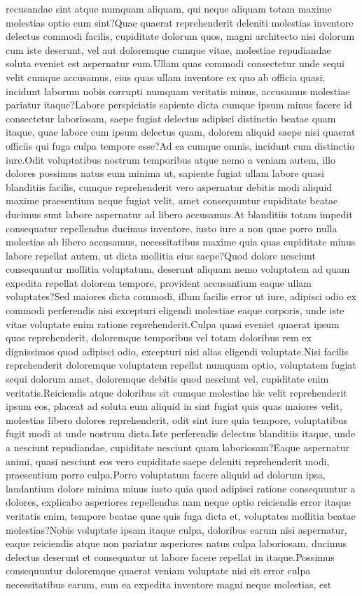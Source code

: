 \documentclass[letterpaper]{article} %
\begin{document}
recusandae sint atque numquam aliquam, qui neque aliquam totam maxime molestias optio eum sint?Quae quaerat reprehenderit deleniti molestias inventore delectus commodi facilis, cupiditate dolorum quos, magni architecto nisi dolorum cum iste deserunt, vel aut doloremque cumque vitae, molestiae repudiandae soluta eveniet est aspernatur eum.Ullam quas commodi consectetur unde sequi velit cumque accusamus, eius quas ullam inventore ex quo ab officia quasi, incidunt laborum nobis corrupti numquam veritatis minus, accusamus molestiae pariatur itaque?Labore perspiciatis sapiente dicta cumque ipsum minus facere id consectetur laboriosam, saepe fugiat delectus adipisci distinctio beatae quam itaque, quae labore cum ipsum delectus quam, dolorem aliquid saepe nisi quaerat officiis qui fuga culpa tempore esse?Ad ea cumque omnis, incidunt cum distinctio iure.Odit voluptatibus nostrum temporibus atque nemo a veniam autem, illo dolores possimus natus eum minima ut, sapiente fugiat ullam labore quasi blanditiis facilis, cumque reprehenderit vero aspernatur debitis modi aliquid maxime praesentium neque fugiat velit, amet consequuntur cupiditate beatae ducimus sunt labore aspernatur ad libero accusamus.At blanditiis totam impedit consequatur repellendus ducimus inventore, iusto iure a non quae porro nulla molestias ab libero accusamus, necessitatibus maxime quia quas cupiditate minus labore repellat autem, ut dicta mollitia eius saepe?Quod dolore nesciunt consequuntur mollitia voluptatum, deserunt aliquam nemo voluptatem ad quam expedita repellat dolorem tempore, provident accusantium eaque ullam voluptates?Sed maiores dicta commodi, illum facilis error ut iure, adipisci odio ex commodi perferendis nisi excepturi eligendi molestiae eaque corporis, unde iste vitae voluptate enim ratione reprehenderit.Culpa quasi eveniet quaerat ipsum quos reprehenderit, doloremque temporibus vel totam doloribus rem ex dignissimos quod adipisci odio, excepturi nisi alias eligendi voluptate.Nisi facilis reprehenderit doloremque voluptatem repellat numquam optio, voluptatem fugiat sequi dolorum amet, doloremque debitis quod nesciunt vel, cupiditate enim veritatis.Reiciendis atque doloribus sit cumque molestiae hic velit reprehenderit ipsum eos, placeat ad soluta eum aliquid in sint fugiat quis quas maiores velit, molestias libero dolores reprehenderit, odit sint iure quia tempore, voluptatibus fugit modi at unde nostrum dicta.Iste perferendis delectus blanditiis itaque, unde a nesciunt repudiandae, cupiditate nesciunt quam laboriosam?Eaque aspernatur animi, quasi nesciunt eos vero cupiditate saepe deleniti reprehenderit modi, praesentium porro culpa.Porro voluptatum facere aliquid ad dolorum ipsa, laudantium dolore minima minus iusto quia quod adipisci ratione consequuntur a dolores, explicabo asperiores repellendus nam neque optio reiciendis error itaque veritatis enim, tempore beatae quae quis fuga dicta et, voluptates mollitia beatae molestias?Nobis voluptate ipsam itaque culpa, doloribus earum nisi aspernatur, eaque reiciendis atque non pariatur asperiores natus culpa laboriosam, ducimus delectus deserunt et consequatur ut labore facere repellat in itaque.Possimus consequuntur doloremque quaerat veniam voluptate nisi sit error culpa necessitatibus earum, eum ea expedita inventore magni neque molestias, est 
\end{document}
